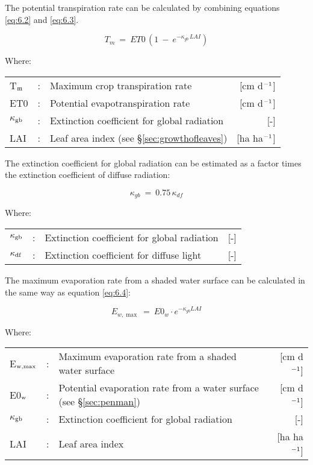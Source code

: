 The potential transpiration rate can be calculated by combining equations \ref{eq:6.2} and 
\ref{eq:6.3}.

\begin{equation}
\label{eq:6.4}
T _{m} ~=~ ET0\, (1~-~e ^{-\kappa _{gb} \, LAI} )
\end{equation}

Where:\\[5pt]
\begin{tabularx}{\textwidth}{llXr}
	T$_{{\rm m}}$ &:& Maximum crop transpiration rate & [cm d$^{{\rm -1}}$]\\
	ET0 &:& Potential evapotranspiration rate & [cm d$^{{\rm -1}}$]\\
	$\kappa$$_{{\rm gb}}$ &:& Extinction coefficient for global radiation & [-]\\
	LAI &:& Leaf area index (see \S \ref{sec:growthofleaves}) & [ha ha$^{{\rm -1}}$]\\
\end{tabularx}

The extinction coefficient for global radiation can be estimated as a factor times the
extinction coefficient of diffuse radiation:

\begin{equation}
\label{eq:6.5}
\kappa_{gb} ~=~ 0.75\, \kappa_{df} 
\end{equation}

Where:\\[5pt]
\begin{tabularx}{\textwidth}{llXr}
	$\kappa_{{\rm gb}}$ &:& Extinction coefficient for global radiation & [-]\\
	$\kappa_{{\rm df}}$ &:& Extinction coefficient for diffuse light & [-]\\
\end{tabularx}

The maximum evaporation rate from a shaded water surface can be calculated in the same
way as equation \ref{eq:6.4}: 

\begin{equation}
\label{eq:6.6}
E_{w,\max } ~=~ E0_{w} \cdot e^{-\kappa_{gb} LAI}
\end{equation}

Where:\\[5pt]
\begin{tabularx}{\textwidth}{llXr}
	E$_{{\rm w,max}}$ &:& Maximum evaporation rate from a shaded water surface & 
	[cm d$^{{\rm -1}}$]\\
	E0$_{{\rm w}}$ &:& Potential evaporation rate from a water surface 
	(see \S \ref{sec:penman}) & [cm d$^{{\rm -1}}$]\\
	$\kappa$$_{{\rm gb}}$ &:& Extinction coefficient for global radiation & [-]\\
	LAI &:& Leaf area index & [ha ha$^{{\rm -1}}$]\\
\end{tabularx}

